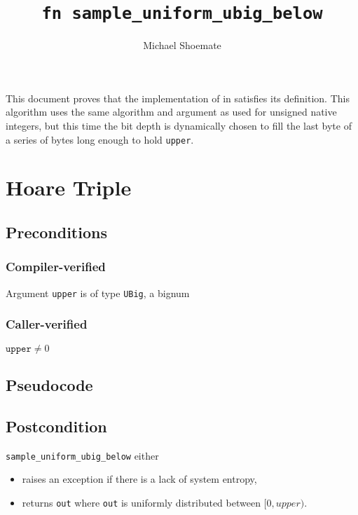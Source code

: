 \documentclass{article}
\title{\texttt{fn sample\_uniform\_ubig\_below}}
\author{Michael Shoemate}
\begin{document}
 
\maketitle 
 
This document proves that the implementation of  in   
satisfies its definition. 
This algorithm uses the same algorithm and argument as used for unsigned native integers,  
but this time the bit depth is dynamically chosen to fill the last byte of a series of bytes long enough to hold \texttt{upper}. 
 
\section{Hoare Triple} 
\subsection*{Preconditions} 
 
\subsubsection*{Compiler-verified} 
Argument \texttt{upper} is of type \texttt{UBig}, a bignum 
 
\subsubsection*{Caller-verified} 
$\texttt{upper} \neq 0$ 
 
\subsection*{Pseudocode} 
 
 
 
\subsection*{Postcondition} 
\texttt{sample\_uniform\_ubig\_below} either 
\begin{itemize} 
    \item raises an exception if there is a lack of system entropy, 
    \item returns \texttt{out} where \texttt{out} is uniformly distributed between $[0, upper)$. 
\end{itemize} 
 
\end{document}

